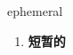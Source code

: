 
\begin{frame}
{\huge ephemeral}
\begin{center}
\begin{enumerate}\Large
  \item \textbf{短暂的}
\end{enumerate}
\end{center}
\end{frame}
